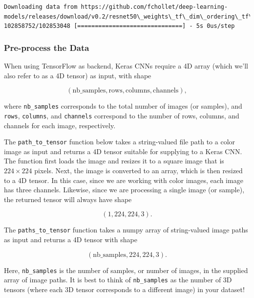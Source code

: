 \documentclass[11pt]{article}
\begin{document}
    \begin{Verbatim}[commandchars=\\\{\}]
Downloading data from https://github.com/fchollet/deep-learning-models/releases/download/v0.2/resnet50\_weights\_tf\_dim\_ordering\_tf\_kernels.h5
102858752/102853048 [==============================] - 5s 0us/step

    \end{Verbatim}

    \hypertarget{pre-process-the-data}{%
\subsubsection{Pre-process the Data}\label{pre-process-the-data}}

When using TensorFlow as backend, Keras CNNs require a 4D array (which
we'll also refer to as a 4D tensor) as input, with shape

\[
(\text{nb_samples}, \text{rows}, \text{columns}, \text{channels}),
\]

where \texttt{nb\_samples} corresponds to the total number of images (or
samples), and \texttt{rows}, \texttt{columns}, and \texttt{channels}
correspond to the number of rows, columns, and channels for each image,
respectively.

The \texttt{path\_to\_tensor} function below takes a string-valued file
path to a color image as input and returns a 4D tensor suitable for
supplying to a Keras CNN. The function first loads the image and resizes
it to a square image that is \(224 \times 224\) pixels. Next, the image
is converted to an array, which is then resized to a 4D tensor. In this
case, since we are working with color images, each image has three
channels. Likewise, since we are processing a single image (or sample),
the returned tensor will always have shape

\[
(1, 224, 224, 3).
\]

The \texttt{paths\_to\_tensor} function takes a numpy array of
string-valued image paths as input and returns a 4D tensor with shape

\[
(\text{nb_samples}, 224, 224, 3).
\]

Here, \texttt{nb\_samples} is the number of samples, or number of
images, in the supplied array of image paths. It is best to think of
\texttt{nb\_samples} as the number of 3D tensors (where each 3D tensor
corresponds to a different image) in your dataset!
\end{document}
